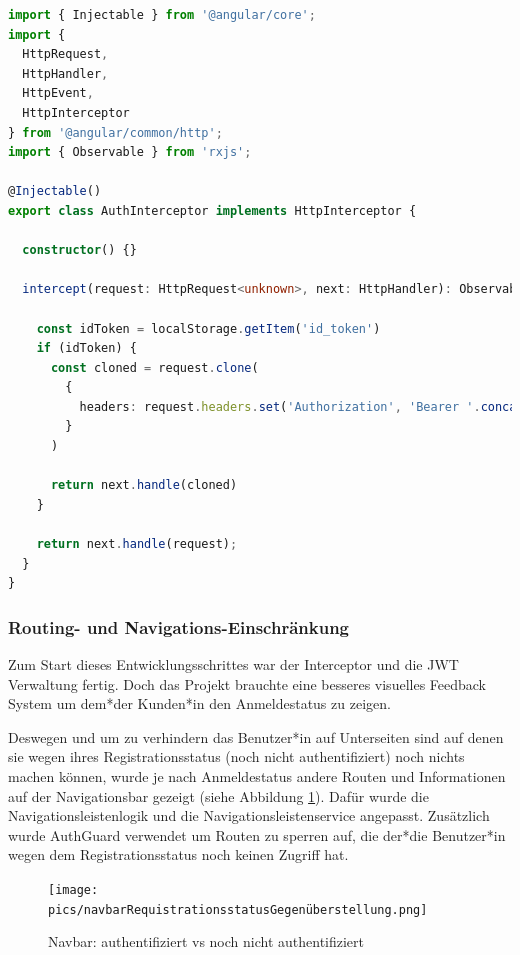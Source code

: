 \begin{lstlisting}[caption=auth.interceptor.ts - add JWT to Request Header,label=lst:impl:sign:JWTInterceptor,language=TypeScript]
import { Injectable } from '@angular/core';
import {
  HttpRequest,
  HttpHandler,
  HttpEvent,
  HttpInterceptor
} from '@angular/common/http';
import { Observable } from 'rxjs';

@Injectable()
export class AuthInterceptor implements HttpInterceptor {

  constructor() {}

  intercept(request: HttpRequest<unknown>, next: HttpHandler): Observable<HttpEvent<unknown>> {

    const idToken = localStorage.getItem('id_token')
    if (idToken) {
      const cloned = request.clone(
        {
          headers: request.headers.set('Authorization', 'Bearer '.concat(idToken))
        }
      )

      return next.handle(cloned)
    }

    return next.handle(request);
  }
}
\end{lstlisting}

\subsubsection{Routing- und Navigations-Einschränkung}
Zum Start dieses Entwicklungsschrittes war der Interceptor und die JWT Verwaltung fertig. Doch das Projekt brauchte eine besseres visuelles Feedback System um dem*der Kunden*in den Anmeldestatus zu zeigen.

Deswegen und um zu verhindern das Benutzer*in auf Unterseiten sind auf denen sie wegen ihres Registrationsstatus (noch nicht authentifiziert) noch nichts machen können, wurde je nach Anmeldestatus andere Routen und Informationen auf der Navigationsbar gezeigt (siehe Abbildung \ref{fig:impl:navbarvergleich}). Dafür wurde die Navigationsleistenlogik und die Navigationsleistenservice angepasst. Zusätzlich wurde AuthGuard verwendet um Routen zu sperren auf, die der*die Benutzer*in wegen dem Registrationsstatus noch keinen Zugriff hat. 

\begin{figure}
  \centering
  \texttt{[image: pics/navbarRequistrationsstatusGegenüberstellung.png]}
  \caption{Navbar: authentifiziert vs noch nicht authentifiziert}
  \label{fig:impl:navbarvergleich}
\end{figure}


